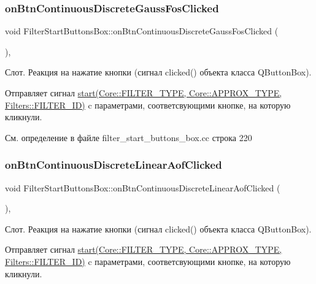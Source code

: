 \subsubsection{\texorpdfstring{on\+Btn\+Continuous\+Discrete\+Gauss\+Fos\+Clicked}{onBtnContinuousDiscreteGaussFosClicked}}
{\footnotesize\ttfamily void Filter\+Start\+Buttons\+Box\+::on\+Btn\+Continuous\+Discrete\+Gauss\+Fos\+Clicked (\begin{DoxyParamCaption}{ }\end{DoxyParamCaption})\hspace{0.3cm}{\ttfamily [private]}, {\ttfamily [slot]}}

Слот. Реакция на нажатие кнопки (сигнал clicked() объекта класса Q\+Button\+Box).

Отправляет сигнал \hyperlink{class_filter_start_buttons_box_ac6e2a6555f1d388391f188f834b8e753}{start(\+Core\+::\+F\+I\+L\+T\+E\+R\+\_\+\+T\+Y\+P\+E, Core\+::\+A\+P\+P\+R\+O\+X\+\_\+\+T\+Y\+P\+E, Filters\+::\+F\+I\+L\+T\+E\+R\+\_\+\+I\+D)} c параметрами, соответсвующими кнопке, на которую кликнули. 

См. определение в файле filter\+\_\+start\+\_\+buttons\+\_\+box.\+cc строка 220

\hypertarget{class_filter_start_buttons_box_ae9d6e1bec50f96b2377e2a85bb4e73ca}{}\label{class_filter_start_buttons_box_ae9d6e1bec50f96b2377e2a85bb4e73ca} 
\subsubsection{\texorpdfstring{on\+Btn\+Continuous\+Discrete\+Linear\+Aof\+Clicked}{onBtnContinuousDiscreteLinearAofClicked}}
{\footnotesize\ttfamily void Filter\+Start\+Buttons\+Box\+::on\+Btn\+Continuous\+Discrete\+Linear\+Aof\+Clicked (\begin{DoxyParamCaption}{ }\end{DoxyParamCaption})\hspace{0.3cm}{\ttfamily [private]}, {\ttfamily [slot]}}

Слот. Реакция на нажатие кнопки (сигнал clicked() объекта класса Q\+Button\+Box).

Отправляет сигнал \hyperlink{class_filter_start_buttons_box_ac6e2a6555f1d388391f188f834b8e753}{start(\+Core\+::\+F\+I\+L\+T\+E\+R\+\_\+\+T\+Y\+P\+E, Core\+::\+A\+P\+P\+R\+O\+X\+\_\+\+T\+Y\+P\+E, Filters\+::\+F\+I\+L\+T\+E\+R\+\_\+\+I\+D)} c параметрами, соответсвующими кнопке, на которую кликнули. 

